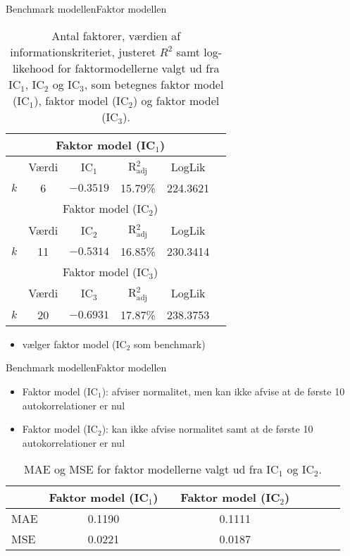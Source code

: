 \begin{frame}{Benchmark modellen}{Faktor modellen}
\begin{table}[h]
\center
\begin{tabular}{lccccc}
\toprule
\multicolumn{5}{c}{Faktor model (IC$_1$)} \\ \midrule
& Værdi &  IC$_1$ &  R$^2_{\text{adj}}$ & LogLik  \\
$k$ & 6 &  $-0.3519$ &  15.79\% &  224.3621  \\ \bottomrule \toprule
\multicolumn{5}{c}{Faktor model (IC$_2$)} \\ \midrule
 & Værdi &  IC$_2$ &  R$^2_{\text{adj}}$ & LogLik \\
 $k$ &11 & $-0.5314$ &  16.85\% &  230.3414 \\\bottomrule \toprule
\multicolumn{5}{c}{Faktor model (IC$_3$)} \\ \midrule
& Værdi &  IC$_3$ &  R$^2_{\text{adj}}$ & LogLik\\
$k$ & 20 & $-0.6931$ & 17.87\% & 238.3753 \\  \bottomrule
 \end{tabular}
 \caption{Antal faktorer, værdien af informationskriteriet, justeret \(R^2\) samt log-likehood for faktormodellerne valgt ud fra IC$_1$, IC$_2$ og IC$_3$, som betegnes faktor model (IC\(_1\)), faktor model (IC\(_2\)) og faktor model (IC\(_3\)).} \label{tab:est_faktor}
\end{table}
\begin{itemize}
\item vælger faktor model (IC\(_2\) som benchmark)
\end{itemize}
\end{frame}

\begin{frame}{Benchmark modellen}{Faktor modellen}
\begin{itemize}
\item Faktor model (IC$_1$): afviser normalitet, men kan ikke afvise at de første 10 autokorrelationer er nul
\item Faktor model (IC$_2$): kan ikke afvise normalitet samt at de første 10 autokorrelationer er nul
\end{itemize}

\begin{table}
\center
\begin{tabular}{lccccccc} \toprule
& Faktor model (IC$_1$) & & Faktor model (IC$_2$)  \\ \midrule
MAE & 0.1190 & & 0.1111 \\ 
MSE &  0.0221  & & 0.0187 \\ \bottomrule
\end{tabular}
\caption{MAE og MSE for faktor modellerne valgt ud fra IC$_1$ og IC$_2$. }
\end{table}
\end{frame}

